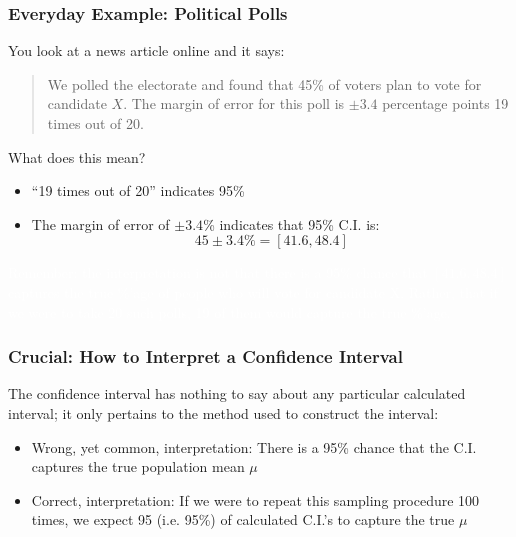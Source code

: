 \documentclass[handout]{beamer}
\newcommand{\blue}[1]{\textcolor{blue2}{#1}}
\begin{document}
\begin{frame}
\frametitle{Everyday Example:  Political Polls}
You look at a news article online and it says:
\begin{quotation}
\noindent We polled the electorate and found that 45\% of voters plan to vote for candidate $X$.  The margin of error for this poll is $\pm 3.4$ percentage points 19 times out of 20.  
\end{quotation}
\pause What does this mean?
\begin{itemize}
\pause \item ``19 times out of 20'' indicates 95\%
\pause \item The \blue{margin of error} of $\pm 3.4$\% indicates that 95\% C.I. is:
\[45 \pm 3.4 \% = [41.6, 48.4]\]
\end{itemize}
\textcolor{white}{Remember: the interpretation is not that there is a 95\% chance that $[41.6, 48.4]$ captures the true \%'age of people who will vote for candidate X.  Rather, that if we were to take 20 such polls, 19 of them would capture the true \%'age.}
\end{frame}




\begin{frame}
\frametitle{Crucial: How to Interpret a Confidence Interval}
The confidence interval has nothing to say about any particular calculated interval; it only pertains to the \blue{method} used to construct the interval:
\vskip 0.25cm
\begin{itemize}
\pause \item\blue{Wrong, yet common, interpretation}:  There is a 95\% chance that the C.I. captures the true population mean $\mu$
\pause \item\blue{Correct, interpretation}:  If we were to repeat this sampling procedure 100 times, we expect 95 (i.e. 95\%) of calculated C.I.'s to capture the true $\mu$
\end{itemize}
 
\end{frame}
\end{document}
